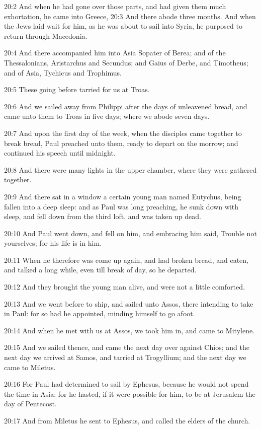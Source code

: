 20:2 And when he had gone over those parts, and had given them much
exhortation, he came into Greece, 20:3 And there abode three months.
And when the Jews laid wait for him, as he was about to sail into
Syria, he purposed to return through Macedonia.

20:4 And there accompanied him into Asia Sopater of Berea; and of the
Thessalonians, Aristarchus and Secundus; and Gaius of Derbe, and
Timotheus; and of Asia, Tychicus and Trophimus.

20:5 These going before tarried for us at Troas.

20:6 And we sailed away from Philippi after the days of unleavened
bread, and came unto them to Troas in five days; where we abode seven
days.

20:7 And upon the first day of the week, when the disciples came
together to break bread, Paul preached unto them, ready to depart on
the morrow; and continued his speech until midnight.

20:8 And there were many lights in the upper chamber, where they were
gathered together.

20:9 And there sat in a window a certain young man named Eutychus,
being fallen into a deep sleep: and as Paul was long preaching, he
sunk down with sleep, and fell down from the third loft, and was taken
up dead.

20:10 And Paul went down, and fell on him, and embracing him said,
Trouble not yourselves; for his life is in him.

20:11 When he therefore was come up again, and had broken bread, and
eaten, and talked a long while, even till break of day, so he
departed.

20:12 And they brought the young man alive, and were not a little
comforted.

20:13 And we went before to ship, and sailed unto Assos, there
intending to take in Paul: for so had he appointed, minding himself to
go afoot.

20:14 And when he met with us at Assos, we took him in, and came to
Mitylene.

20:15 And we sailed thence, and came the next day over against Chios;
and the next day we arrived at Samos, and tarried at Trogyllium; and
the next day we came to Miletus.

20:16 For Paul had determined to sail by Ephesus, because he would not
spend the time in Asia: for he hasted, if it were possible for him, to
be at Jerusalem the day of Pentecost.

20:17 And from Miletus he sent to Ephesus, and called the elders of
the church.


